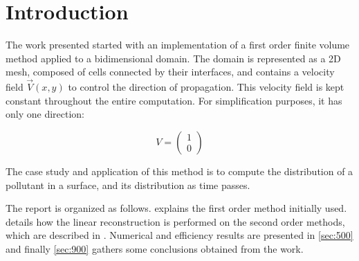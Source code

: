 \section{Introduction}
\label{sec:100}

The work presented started with an implementation of a first order finite volume method applied to a bidimensional domain. The domain is represented as a 2D mesh, composed of cells connected by their interfaces, and contains a velocity field $\vec{V}(x, y)$ to control the direction of propagation. This velocity field is kept constant throughout the entire computation. For simplification purposes, it has only one direction:

$$V = \left( \begin{array}{c} 1 \\ 0 \end{array} \right) $$

The case study and application of this method is to compute the distribution of a pollutant in a surface, and its distribution as time passes.

The report is organized as follows.  explains the first order method initially used.  details how the linear reconstruction is performed on the second order methods, which are described in . Numerical and efficiency results are presented in \cref{sec:500} and finally \cref{sec:900} gathers some conclusions obtained from the work.
